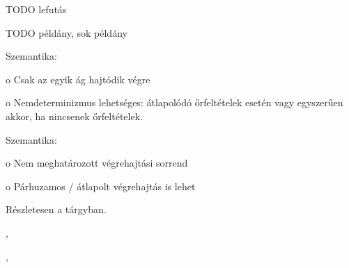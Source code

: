 TODO lefutás

TODO példány, sok példány







\begin{definicio}
\end{definicio}

\begin{definicio}
\end{definicio}


Szemantika:

o Csak az egyik ág hajtódik végre

o Nemdeterminizmus lehetséges: átlapolódó őrfeltételek esetén vagy egyszerűen akkor, ha nincsenek őrfeltételek.


Szemantika:

o Nem meghatározott végrehajtási sorrend

o Párhuzamos / átlapolt végrehajtás is lehet

Részletesen a \szgarch tárgyban.

\begin{definicio}
\end{definicio}


\begin{definicio}
	, 
\end{definicio}


\begin{definicio}
	, 
\end{definicio}



\begin{definicio}
\end{definicio}

